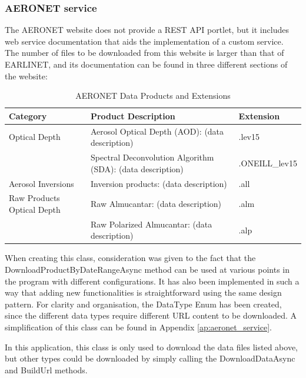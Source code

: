 \subsubsection{AERONET service}\smallskip
{The AERONET website does not provide a REST API portlet, but it includes web service documentation that aids the implementation of a custom service.\smallskip\\
The number of files to be downloaded from this website is larger than that of EARLINET, and its documentation can be found in three different sections of the website:}
\begin{table}[H]
    \centering
    \caption{AERONET Data Products and Extensions}
    \label{tab:aeronet_products}
    \begin{tabularx}{\textwidth}{lXl}
        \toprule
        \textbf{Category} & \textbf{Product Description} & \textbf{Extension} \\
        \midrule
        Optical Depth \cite{aod_solar} & Aerosol Optical Depth (AOD): (data description) & .lev15 \\
        & Spectral Deconvolution Algorithm (SDA): (data description) & .ONEILL\_lev15 \\
        \addlinespace
        Aerosol Inversions \cite{inversions_aod_solar} & Inversion products: (data description) & .all \\
        \addlinespace
        Raw Products Optical Depth \cite{raw_aod_solar} & Raw Almucantar: (data description) & .alm \\
        & Raw Polarized Almucantar: (data description) & .alp \\
        \bottomrule
    \end{tabularx}
\end{table}
{When creating this class, consideration was given to the fact that the DownloadProductByDateRangeAsync method can be used at various points in the program with different configurations. It has also been implemented in such a way that adding new functionalities is straightforward using the same design pattern. For clarity and organisation, the DataType Enum has been created, since the different data types require different URL content to be downloaded. A simplification of this class can be found in Appendix \ref{ap:aeronet_service}.\smallskip\\}

{In this application, this class is only used to download the data files listed above, but other types could be downloaded by simply calling the DownloadDataAsync and BuildUrl methods.}

